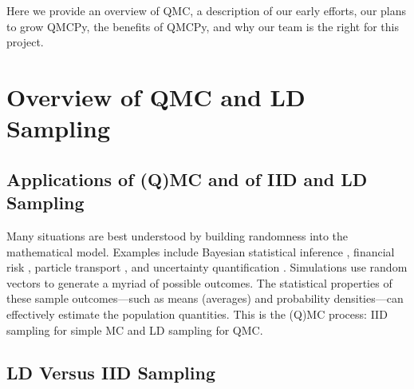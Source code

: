 \documentclass[11pt]{NSFamsart}
\begin{document}
Here we provide an overview of QMC, a description of our early efforts, our plans to grow QMCPy, the benefits of QMCPy, and why our team is the right for this project.

\section{Overview of QMC and LD Sampling}

\subsection{Applications of (Q)MC and of IID and LD Sampling}  
Many situations are best understood by building randomness into the mathematical model.  Examples include Bayesian statistical inference \cite{GelEtal13, EfrHas16}, financial risk \cite{Gla03,LEc09}, particle transport \cite{Hag14,Spa95,Vea97}, and uncertainty quantification \cite{Smi14a,HerSch20a}.  Simulations use random vectors to generate a myriad of possible outcomes.  The statistical properties of these sample outcomes---such as means (averages) and probability densities---can effectively estimate the population quantities.  This is the (Q)MC process:  IID sampling for simple MC and LD sampling for QMC.

\subsection{LD Versus IID Sampling} \label{sec:LDvsIID}
\end{document}
